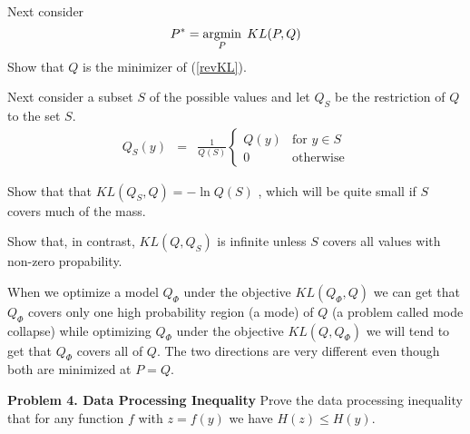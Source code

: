 \documentclass{article}
\newcommand{\solution}[1]{}
\begin{document}
\bigskip
Next consider
\begin{equation}
  \label{revKL}
  P^* = \operatorname*{argmin}_P\;KL(P,Q)
\end{equation}
Show that $Q$ is the minimizer of (\ref{revKL}).

\solution{
  This follows from
  \begin{eqnarray*}
    KL(P,P) & = & E_{y \sim P} \ln \frac{P(x)}{P(x)} = 0 \\
    KL(P,Q) & \geq & 0
  \end{eqnarray*}
}

\bigskip
Next consider a subset $S$ of the possible values and let $Q_S$ be the restriction of $Q$ to the set $S$.
\begin{eqnarray*}
  Q_S(y) & = & \frac{1}{Q(S)}\left\{\begin{array}{ll} Q(y) & \mbox{for $y \in S$} \\ 0 & \mbox{otherwise} \end{array}\right.
\end{eqnarray*}

Show that that $KL(Q_S,Q) = -\ln Q(S)$ , which will be quite small if $S$ covers much of the mass.

\solution{
  \begin{eqnarray*}
    KL(Q_S,Q) & = & E_{y \sim Q_S}\;\ln \frac{Q_S(y)}{Q(y)} \\
    & = & E_{y \sim Q_S} \; \ln \frac{Q(y)/Q(S)}{Q(y)} \\
    & = & E_{y \sim Q_S} \; - \ln Q(S) \\
    & = & -\ln Q(S)
  \end{eqnarray*}
}

\medskip
Show that, in contrast, $KL(Q,Q_S)$ is infinite unless $S$ covers all values with non-zero propability.

\solution{
  If there exists a value $\tilde{y}$ not in $S$ with $P(\tilde{y}) > 0$ then
  $$E_{y \sim P}\;- \ln P_S(y) \geq - P(\tilde{y}) \ln 0 = \infty$$
  }


When we optimize a model $Q_\Phi$ under the objective $KL(Q_\Phi,Q)$ we can get that $Q_\Phi$ covers only one high probability region (a mode) of $Q$ (a problem called mode collapse)
while optimizing $Q_\Phi$ under the objective $KL(Q,Q_\Phi)$ we will tend to get that $Q_\Phi$ covers all of $Q$.  The two directions are very different even though both
are minimized at $P = Q$.


\bigskip
{\bf Problem 4. Data Processing Inequality}
Prove the data processing inequality that for any function $f$ with $z = f(y)$ we have $H(z) \leq H(y)$.
\end{document}
